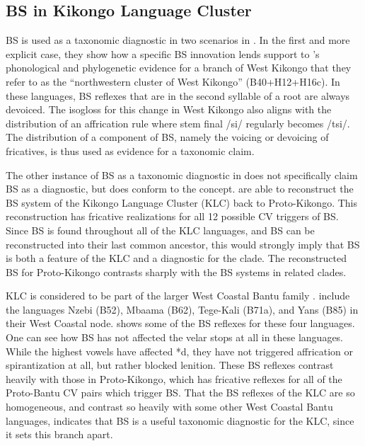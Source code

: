 \documentclass[output=paper,colorlinks,citecolor=brown
]{langscibook}
\begin{document}
\subsection{BS in Kikongo Language Cluster}

BS is used as a taxonomic diagnostic in two scenarios in \citet{bostoen2019}. In the first and more explicit case, they show how a specific BS innovation lends support to \citeauthor{deSchryver2015}'s \citeyear{deSchryver2015} phonological and phylogenetic evidence for a branch of West Kikongo that they refer to as the “northwestern cluster of West Kikongo” (B40+H12+H16c). In these languages, BS reflexes that are in the second syllable of a root are always devoiced. The isogloss for this change in West Kikongo also aligns with the distribution of an affrication rule where stem final /si/ regularly becomes /tsi/. The distribution of a component of BS, namely the voicing or devoicing of fricatives, is thus used as evidence for a taxonomic claim.

The other instance of BS as a taxonomic diagnostic in \citet{bostoen2019} does not specifically claim BS as a diagnostic, but does conform to the concept. \citeauthor{bostoen2019} are able to reconstruct the BS system of the Kikongo Language Cluster (KLC) back to Proto-Kikongo. This reconstruction has fricative realizations for all 12 possible CV triggers of BS. Since BS is found throughout all of the KLC languages, and BS can be reconstructed into their last common ancestor, this would strongly imply that BS is both a feature of the KLC and a diagnostic for the clade. The reconstructed BS for Proto-Kikongo contrasts sharply with the BS systems in related clades.

KLC is considered to be part of the larger West Coastal Bantu family \citep{bostoen2019, bostoen2018}. \citet{bostoen2018} include the languages Nzebi (B52), Mbaama (B62), Tege-Kali (B71a), and Yans (B85) in their West Coastal node.    shows some of the BS reflexes for these four languages. One can see how BS has not affected the velar stops at all in these languages. While the highest vowels have affected *d, they have not triggered affrication or spirantization at all, but rather blocked lenition. These BS reflexes contrast heavily with those in Proto-Kikongo, which has fricative reflexes for all of the Proto-Bantu CV pairs which trigger BS. That the BS reflexes of the KLC are so homogeneous, and contrast so heavily with some other West Coastal Bantu languages, indicates that BS is a useful taxonomic diagnostic for the KLC, since it sets this branch apart.
\end{document}
